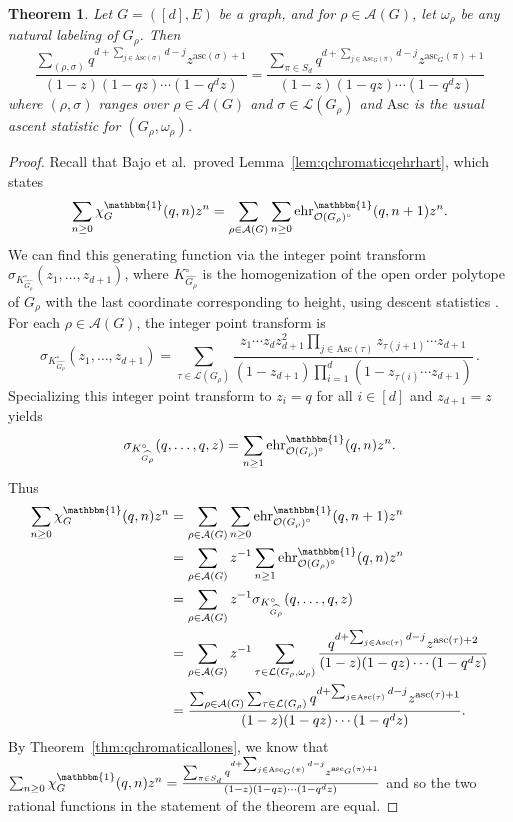 \documentclass[11pt]{amsart}
\newtheorem{theorem}{Theorem}  [section] \numberwithin{equation}{section}
\newcommand\ehr{\operatorname{ehr}}
\newcommand{\asc}{\mathrm{Asc}}
\newcommand{\ascnum}{\mathrm{asc}}
\newcommand{\order}[1]{\mathcal{O}(#1)}
\newcommand{\acyclic}[1]{\mathcal{A}(#1)}
\newcommand{\jhset}[1]{\mathcal{L}(#1)}
\begin{document}
\begin{theorem}\label{thm:qchromaticgenfunctiondoublesum}
    Let $G = ([d],E)$ be a graph, and for $\rho \in \acyclic{G}$, let $\omega_\rho$ be any natural labeling of $G_\rho$. Then
    \[
        \frac{\sum_{(\rho,\sigma)} q^{d+\sum_{j \in \asc(\sigma)} d-j} z^{\ascnum(\sigma)+1}}{(1-z)(1-qz) \cdots (1-q^d z)} = \frac{\sum_{\pi \in S_d} q^{d+\sum_{j \in \asc_G(\pi)} d-j} z^{\ascnum_G(\pi)+1}}{(1-z)(1-qz) \cdots (1-q^d z)}
    \]
    where $(\rho,\sigma)$ ranges over $\rho \in \acyclic{G}$ and $\sigma \in \jhset{G_\rho}$ and $\asc$ is the
usual ascent statistic for $(G_\rho,\omega_\rho)$.
\end{theorem}
\begin{proof}
    Recall that Bajo et al.\ proved Lemma~\ref{lem:qchromaticqehrhart}, which states
    \[
        \sum_{n \geq 0} \chi^\mathbbm{1}_G(q,n) z^n = \sum_{\rho \in \acyclic{G}} \sum_{n \geq 0}  \ehr^\mathbbm{1}_{\order{G_\rho}^\circ}(q,n+1) z^n.
    \]
    We can find this generating function via the integer point transform $\sigma_{K_{\widehat{G_\rho}}^\circ}(z_1,\ldots,z_{d+1})$, where $K_{\widehat{G_\rho}}^\circ$ is the homogenization of the open order polytope of $G_\rho$ with the last coordinate corresponding to height, using descent statistics \cite[Exercise 6.23]{crt}.
    For each $\rho \in \acyclic{G}$, the integer point transform is
    \[
    \sigma_{K_{\widehat{G_\rho}}^\circ}(z_1,\ldots,z_{d+1}) = \sum_{\tau \in \jhset{G_\rho}} \frac{z_1 \cdots z_d z_{d+1}^2 \prod_{j \in \asc(\tau)} z_{\tau(j+1)} \cdots z_{d+1} }{(1-z_{d+1}) \prod_{i=1}^{d}(1-z_{\tau(i)} \cdots z_{d+1}) }  \, .
    \]
    Specializing this integer point transform to $z_i = q$ for all $i \in [d]$ and $z_{d+1}=z$ yields
    \[
        \sigma_{K_{\widehat{G_\rho}}^\circ}(q,\ldots,q,z) = \sum_{n \geq 1}  \ehr^\mathbbm{1}_{\order{G_\rho}^\circ}(q,n) z^n.
    \]
    Thus
    \begin{align*}
        \sum_{n \geq 0} \chi^\mathbbm{1}_G(q,n) z^n &= \sum_{\rho \in \acyclic{G}} \sum_{n \geq 0} \ehr^\mathbbm{1}_{\order{G_\rho}^\circ}(q,n+1) z^n \\
        &= \sum_{\rho \in \acyclic{G}} z^{-1} \sum_{n \geq 1}  \ehr^\mathbbm{1}_{\order{G_\rho}^\circ}(q,n) z^n \\
        &= \sum_{\rho \in \acyclic{G}} z^{-1} \sigma_{K_{\widehat{G_\rho}}^\circ}(q,\ldots,q,z) \\
        &= \sum_{\rho \in \acyclic{G}} z^{-1}\sum_{\tau \in \jhset{G_\rho,\omega_\rho}} \frac{q^{d+\sum_{j \in \asc(\tau)}d-j} z^{\ascnum(\tau)+2}}{(1-z)(1-qz) \cdots(1-q^dz)} \\
        &= \frac{\sum_{\rho \in \acyclic{G}} \sum_{\tau \in \jhset{G_\rho}} q^{d+\sum_{j \in \asc(\tau)}d-j} z^{\ascnum(\tau)+1} }{(1-z)(1-qz) \cdots(1-q^dz)}.
    \end{align*} 
    By Theorem~\ref{thm:qchromaticallones}, we know that $\sum_{n \geq 0} \chi^\mathbbm{1}_G(q,n) z^n = \frac{\sum_{\pi \in S_d} q^{d+\sum_{j \in \asc_G(\pi)} d-j} z^{\ascnum_G(\pi)+1}}{(1-z)(1-qz) \cdots (1-q^d z)}$ and so the two rational functions in the statement of the theorem are equal.
\end{proof}
\end{document}
